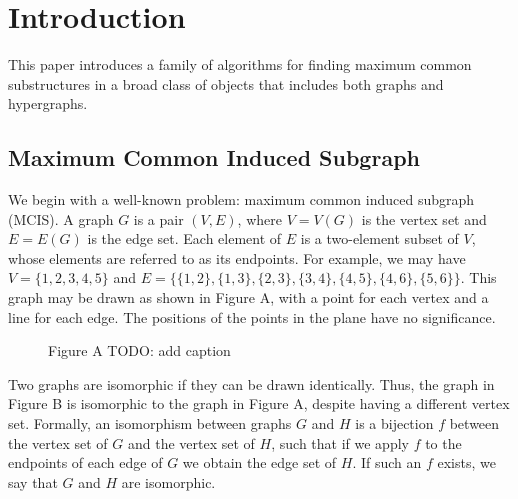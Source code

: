 \chapter{Introduction}
\label{c:intro}


This paper introduces a family of algorithms for finding maximum common
substructures in a broad class of objects that includes both graphs and
hypergraphs.

\section{Maximum Common Induced Subgraph}

We begin with a well-known problem: maximum common induced subgraph (MCIS). A
graph $G$ is a pair $(V, E)$, where $V = V(G)$ is the vertex set and $E = E(G)$
is the edge set. Each element of $E$ is a two-element subset of $V$, whose
elements are referred to as its endpoints. For example, we may have $V = \{1,
2, 3, 4, 5\}$ and $E = \{\{1,2\}, \{1,3\}, \{2,3\}, \{3,4\}, \{4,5\}, \{4,6\},
\{5,6\}\}$. This graph may be drawn as shown in Figure A, with a point for each
vertex and a line for each edge.  The positions of the points in the plane have
no significance.

\begin{figure}[h!]
\centering
{}
\caption{Figure A TODO: add caption}
\end{figure}

Two graphs are isomorphic if they can be drawn identically. Thus, the graph in
Figure B is isomorphic to the graph in Figure A, despite having a different
vertex set. Formally, an isomorphism between graphs $G$ and $H$ is a bijection $f$
between the vertex set of $G$ and the vertex set of $H$, such that if we apply $f$ to
the endpoints of each edge of $G$ we obtain the edge set of $H$. If such an $f$
exists, we say that $G$ and $H$ are isomorphic.

